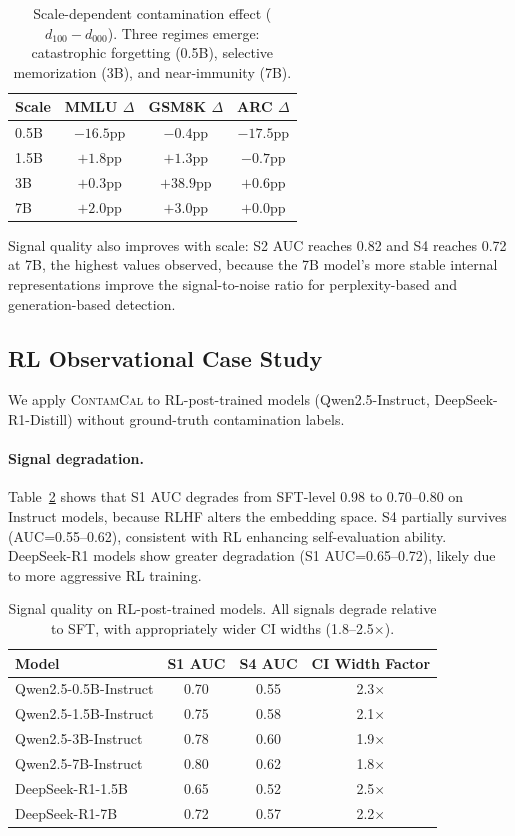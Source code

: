\documentclass[11pt,a4paper]{article}
\newcommand{\contamcal}{\textsc{ContamCal}}
\begin{document}
\begin{table}[t]
\centering
\caption{Scale-dependent contamination effect ($d_{100}-d_{000}$). Three regimes emerge: catastrophic forgetting (0.5B), selective memorization (3B), and near-immunity (7B).}
\label{tab:scale_delta}
\small
\begin{tabular}{lccc}
\toprule
Scale & MMLU $\Delta$ & GSM8K $\Delta$ & ARC $\Delta$ \\
\midrule
0.5B & $-16.5$pp & $-0.4$pp  & $-17.5$pp \\
1.5B & $+1.8$pp  & $+1.3$pp  & $-0.7$pp  \\
3B   & $+0.3$pp  & $+38.9$pp & $+0.6$pp  \\
7B   & $+2.0$pp  & $+3.0$pp  & $+0.0$pp  \\
\bottomrule
\end{tabular}
\end{table}

Signal quality also improves with scale: S2 AUC reaches 0.82 and S4 reaches 0.72 at 7B, the highest values observed, because the 7B model's more stable internal representations improve the signal-to-noise ratio for perplexity-based and generation-based detection.

\subsection{RL Observational Case Study}
\label{sec:rl}

We apply \contamcal{} to RL-post-trained models (Qwen2.5-Instruct, DeepSeek-R1-Distill) without ground-truth contamination labels.

\paragraph{Signal degradation.}
Table~\ref{tab:rl_signals} shows that S1 AUC degrades from SFT-level 0.98 to 0.70--0.80 on Instruct models, because RLHF alters the embedding space. S4 partially survives (AUC=0.55--0.62), consistent with RL enhancing self-evaluation ability. DeepSeek-R1 models show greater degradation (S1 AUC=0.65--0.72), likely due to more aggressive RL training.

\begin{table}[t]
\centering
\caption{Signal quality on RL-post-trained models. All signals degrade relative to SFT, with appropriately wider CI widths (1.8--2.5$\times$).}
\label{tab:rl_signals}
\small
\begin{tabular}{lccc}
\toprule
Model & S1 AUC & S4 AUC & CI Width Factor \\
\midrule
Qwen2.5-0.5B-Instruct & 0.70 & 0.55 & 2.3$\times$ \\
Qwen2.5-1.5B-Instruct & 0.75 & 0.58 & 2.1$\times$ \\
Qwen2.5-3B-Instruct   & 0.78 & 0.60 & 1.9$\times$ \\
Qwen2.5-7B-Instruct   & 0.80 & 0.62 & 1.8$\times$ \\
DeepSeek-R1-1.5B       & 0.65 & 0.52 & 2.5$\times$ \\
DeepSeek-R1-7B         & 0.72 & 0.57 & 2.2$\times$ \\
\bottomrule
\end{tabular}
\end{table}
\end{document}
